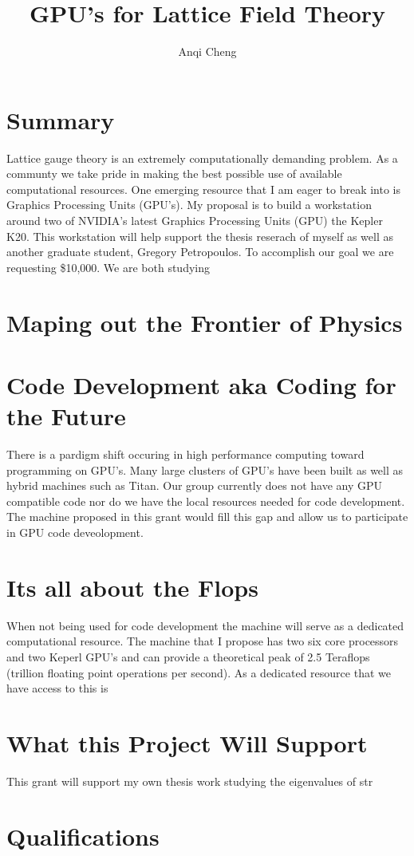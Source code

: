 \documentclass[11pt]{article}
\begin{document}
  \title{GPU's for Lattice Field Theory}
  \author{Anqi Cheng}
  \maketitle

  \section*{Summary}
  Lattice gauge theory is an extremely computationally demanding problem.  As a communty we take pride in making the best possible use of available computational resources.  One emerging resource that I am eager to break into is Graphics Processing Units (GPU's).   My proposal is to build a workstation around two of NVIDIA's latest Graphics Processing Units (GPU) the Kepler K20.  This workstation will help support the thesis reserach of myself as well as another graduate student, Gregory Petropoulos.  To accomplish our goal we are requesting \$10,000.  We are both studying 

  \section*{Maping out the Frontier of Physics}
  
  
  \section*{Code Development aka Coding for the Future}
  There is a pardigm shift occuring in high performance computing toward programming on GPU's.  
  Many large clusters of GPU's have been built as well as hybrid machines such as Titan.  
  Our group currently does not have any GPU compatible code nor do we have the local resources needed for code development.  
  The machine proposed in this grant would fill this gap and allow us to participate in GPU code deveolopment.  
  
  \section*{Its all about the Flops}
  When not being used for code development the machine will serve as a dedicated computational resource.  
  The machine that I propose has two six core processors and two Keperl GPU's and can provide a theoretical peak of 2.5 Teraflops (trillion floating point operations per second).  
  As a dedicated resource that we have access to this is

  \section*{What this Project Will Support}
  This grant will support my own thesis work studying the eigenvalues of str

  \section*{Qualifications}
\end{document}
